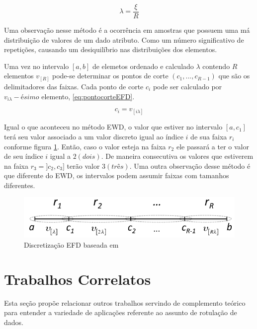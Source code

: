\begin{equation}
\lambda = \frac{\xi}{R}
 \label{eq:qtdelemfaixaEFD}
\end{equation}

Uma observação nesse método é a ocorrência em amostras que possuem uma má distribuição de valores de um dado atributo. Como um número significativo de repetições, causando um desiquilíbrio nas distribuições dos elementos.

Uma vez no intervalo ${[a,b]}$ de elemetos ordenado e calculado ${\lambda}$ contendo ${R}$ elementos ${v_{[R]}}$  pode-se determinar os pontos de corte ${(c_1,...,c_{R-1})}$ que são os delimitadores das faixas. Cada ponto de corte ${c_i}$ pode ser calculado por ${v_{i\lambda}-ésimo}$ elemento, \ref{eq:pontocorteEFD}.

\begin{equation}
c_i = v_{[i\lambda]}
 \label{eq:pontocorteEFD}
\end{equation}

Igual o que aconteceu no método EWD, o valor que estiver no intervalo ${[a,c_1]}$ terá seu valor associado a um valor discreto igual ao índice ${i}$ de sua faixa ${r_i}$ conforme figura \ref{fig:faixasEFD}. Então, caso o valor esteja na faixa ${r_2}$ ele passará a ter o valor de seu índice ${i}$ igual a ${2(dois)}$. De maneira consecutiva os valores que estiverem na faixa ${r_3=]c_2,c_3]}$ terão valor ${3(três)}$. Uma outra observação desse método é que diferente do EWD, os intervalos podem assumir faixas com tamanhos diferentes.

\begin{figure}[h]
        \centering
        \includegraphics[scale=0.6]{figs/discretizacaoEFD.png}
        \caption[Discretização EFD]{Discretização EFD baseada em \cite{LOPES2014}} 
        \label{fig:faixasEFD}
\end{figure} 


\section{Trabalhos Correlatos}\label{cap:refTeor:sec:trabcorrel}

Esta seção propõe relacionar outros trabalhos servindo de complemento teórico para entender a variedade de aplicações referente ao assunto de rotulação de dados.

